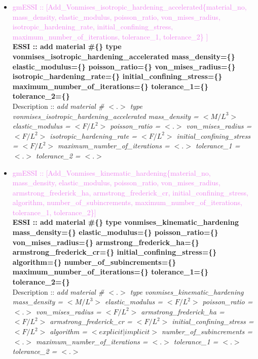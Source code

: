 \documentclass[11pt]{article}
\begin{document}
\begin{itemize}
      \item \textcolor{violet}{gmESSI :: [Add\_Vonmises\_isotropic\_hardening\_accelerated\{material\_no, mass\_density, elastic\_modulus, poisson\_ratio, von\_mises\_radius, isotropic\_hardening\_rate, initial\_confining\_stress, maximum\_number\_of\_iterations, tolerance\_1, tolerance\_2\} ]}\\
      \textbf{ESSI :: add material \#\{\} type vonmises\_isotropic\_hardening\_accelerated mass\_density=\{\} elastic\_modulus=\{\} poisson\_ratio=\{\} von\_mises\_radius=\{\} isotropic\_hardening\_rate=\{\} initial\_confining\_stress=\{\} maximum\_number\_of\_iterations=\{\} tolerance\_1=\{\} tolerance\_2=\{\} } \\
      Description ::  \textit{ add material \# $<.>$ type vonmises\_isotropic\_hardening\_accelerated mass\_density = $<M/L^3>$ elastic\_modulus = $<F/L^2>$ poisson\_ratio = $<.>$ von\_mises\_radius = $<F/L^2>$ isotropic\_hardening\_rate = $<F/L^2>$ initial\_confining\_stress = $<F/L^2>$  maximum\_number\_of\_iterations = $<.>$ tolerance\_1 = $<.>$ tolerance\_2 = $<.>$} 

      \item \textcolor{violet}{gmESSI :: [Add\_Vonmises\_kinematic\_hardening\{material\_no, mass\_density, elastic\_modulus, poisson\_ratio, von\_mises\_radius, armstrong\_frederick\_ha, armstrong\_frederick\_cr, initial\_confining\_stress, algorithm, number\_of\_subincrements, maximum\_number\_of\_iterations, tolerance\_1, tolerance\_2\}]}\\
      \textbf{ESSI :: add material \#\{\} type vonmises\_kinematic\_hardening mass\_density=\{\} elastic\_modulus=\{\} poisson\_ratio=\{\} von\_mises\_radius=\{\} armstrong\_frederick\_ha=\{\} armstrong\_frederick\_cr=\{\} initial\_confining\_stress=\{\} algorithm=\{\} number\_of\_subincrements=\{\} maximum\_number\_of\_iterations=\{\} tolerance\_1=\{\} tolerance\_2=\{\} }\\
      Description ::  \textit{ add material \# $<.>$ type vonmises\_kinematic\_hardening mass\_density = $<M/L^3>$ elastic\_modulus = $<F/L^2>$ poisson\_ratio = $<.>$ von\_mises\_radius = $<F/L^2>$ armstrong\_frederick\_ha = $<F/L^2>$ armstrong\_frederick\_cr = $<F/L^2>$ initial\_confining\_stress = $<F/L^2>$ algorithm = $<explicit|implicit>$ number\_of\_subincrements = $<.>$ maximum\_number\_of\_iterations = $<.>$ tolerance\_1 = $<.>$ tolerance\_2 = $<.>$} 


\end{itemize}
\end{document}
